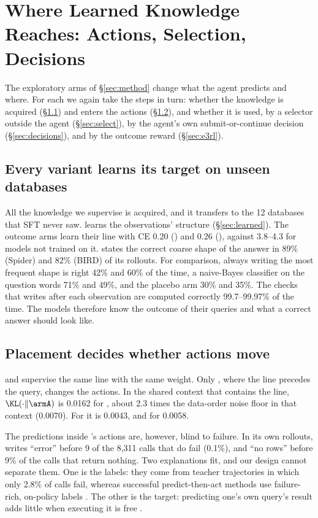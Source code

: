 \section{Where Learned Knowledge Reaches: Actions, Selection, Decisions}
\label{sec:what}

The exploratory arms of \S\ref{sec:method} change what the agent predicts and where. For each we again take the steps in turn: whether the knowledge is acquired (\S\ref{sec:learned-all}) and enters the actions (\S\ref{sec:placement}), and whether it is used, by a selector outside the agent (\S\ref{sec:select}), by the agent's own submit-or-continue decision (\S\ref{sec:decisions}), and by the outcome reward (\S\ref{sec:e3rl}).

\subsection{Every variant learns its target on unseen databases}
\label{sec:learned-all}
All the knowledge we supervise is acquired, and it transfers to the 12 databases that SFT never saw.
\armB{} learns the observations' structure (\S\ref{sec:learned}). The outcome arms learn their line with CE 0.20 (\armE{}) and 0.26 (\armF{}), against 3.8--4.3 for models not trained on it. \armG{} states the correct coarse shape of the answer in 89\% (Spider) and 82\% (BIRD) of its rollouts. For comparison, always writing the most frequent shape is right 42\% and 60\% of the time, a naive-Bayes classifier on the question words 71\% and 49\%, and the placebo arm 30\% and 35\%. The checks that \armG{} writes after each observation are computed correctly 99.7--99.97\% of the time.
The models therefore know the outcome of their queries and what a correct answer should look like.

\subsection{Placement decides whether actions move}
\label{sec:placement}
\armE{} and \armF{} supervise the same line with the same weight. Only \armF{}, where the line precedes the query, changes the actions. In the shared context that contains the line, $\KL(\cdot\|\armA)$ is 0.0162 for \armF{}, about 2.3 times the data-order noise floor in that context (0.0070). For \armE{} it is 0.0043, and for \armB{} 0.0058.

The predictions inside \armF's actions are, however, blind to failure. In its own rollouts, \armF{} writes ``error'' before 9 of the 8,311 calls that do fail (0.1\%), and ``no rows'' before 9\% of the calls that return nothing. Two explanations fit, and our design cannot separate them. One is the labels: they come from teacher trajectories in which only 2.8\% of calls fail, whereas successful predict-then-act methods use failure-rich, on-policy labels \citep{chen2025spa,zhang2025earlyexperience}. The other is the target: predicting one's own query's result adds little when executing it is free \citep{copet2025cwm,fu2024preact}.

